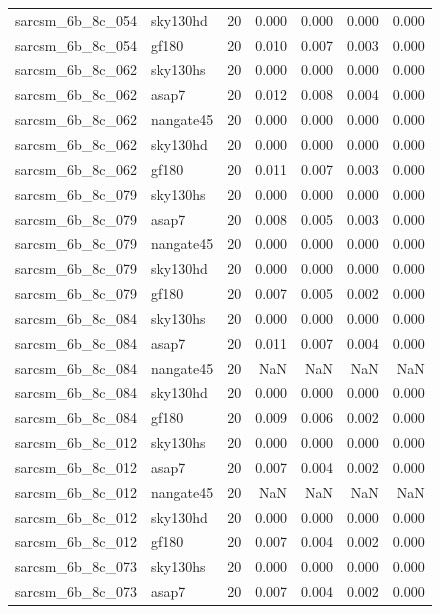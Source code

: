 \begin{tabular}{llrrrrr}
sarcsm\_6b\_8c\_054 & sky130hd & 20 & 0.000 & 0.000 & 0.000 & 0.000 \\
sarcsm\_6b\_8c\_054 & gf180 & 20 & 0.010 & 0.007 & 0.003 & 0.000 \\
sarcsm\_6b\_8c\_062 & sky130hs & 20 & 0.000 & 0.000 & 0.000 & 0.000 \\
sarcsm\_6b\_8c\_062 & asap7 & 20 & 0.012 & 0.008 & 0.004 & 0.000 \\
sarcsm\_6b\_8c\_062 & nangate45 & 20 & 0.000 & 0.000 & 0.000 & 0.000 \\
sarcsm\_6b\_8c\_062 & sky130hd & 20 & 0.000 & 0.000 & 0.000 & 0.000 \\
sarcsm\_6b\_8c\_062 & gf180 & 20 & 0.011 & 0.007 & 0.003 & 0.000 \\
sarcsm\_6b\_8c\_079 & sky130hs & 20 & 0.000 & 0.000 & 0.000 & 0.000 \\
sarcsm\_6b\_8c\_079 & asap7 & 20 & 0.008 & 0.005 & 0.003 & 0.000 \\
sarcsm\_6b\_8c\_079 & nangate45 & 20 & 0.000 & 0.000 & 0.000 & 0.000 \\
sarcsm\_6b\_8c\_079 & sky130hd & 20 & 0.000 & 0.000 & 0.000 & 0.000 \\
sarcsm\_6b\_8c\_079 & gf180 & 20 & 0.007 & 0.005 & 0.002 & 0.000 \\
sarcsm\_6b\_8c\_084 & sky130hs & 20 & 0.000 & 0.000 & 0.000 & 0.000 \\
sarcsm\_6b\_8c\_084 & asap7 & 20 & 0.011 & 0.007 & 0.004 & 0.000 \\
sarcsm\_6b\_8c\_084 & nangate45 & 20 & NaN & NaN & NaN & NaN \\
sarcsm\_6b\_8c\_084 & sky130hd & 20 & 0.000 & 0.000 & 0.000 & 0.000 \\
sarcsm\_6b\_8c\_084 & gf180 & 20 & 0.009 & 0.006 & 0.002 & 0.000 \\
sarcsm\_6b\_8c\_012 & sky130hs & 20 & 0.000 & 0.000 & 0.000 & 0.000 \\
sarcsm\_6b\_8c\_012 & asap7 & 20 & 0.007 & 0.004 & 0.002 & 0.000 \\
sarcsm\_6b\_8c\_012 & nangate45 & 20 & NaN & NaN & NaN & NaN \\
sarcsm\_6b\_8c\_012 & sky130hd & 20 & 0.000 & 0.000 & 0.000 & 0.000 \\
sarcsm\_6b\_8c\_012 & gf180 & 20 & 0.007 & 0.004 & 0.002 & 0.000 \\
sarcsm\_6b\_8c\_073 & sky130hs & 20 & 0.000 & 0.000 & 0.000 & 0.000 \\
sarcsm\_6b\_8c\_073 & asap7 & 20 & 0.007 & 0.004 & 0.002 & 0.000 \\

\end{tabular}
